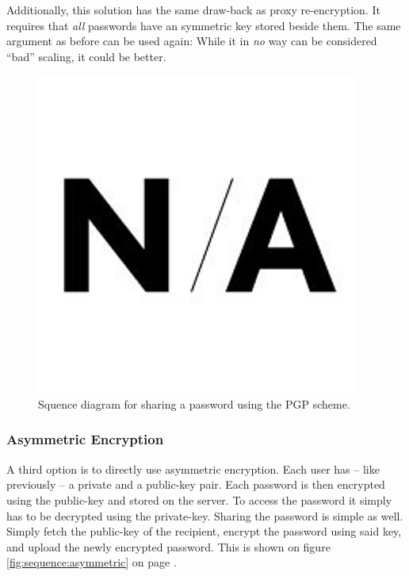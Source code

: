 				Additionally, this solution has the same draw-back as proxy re-encryption. It requires that \emph{all} passwords have an symmetric key stored beside them. The same argument as before can be used again: While it in \emph{no} way can be considered ``bad'' scaling, it could be better.

				\begin{figure}[h!]
					\centering
					\includegraphics[width=\textwidth]{figures/design/na.png}
					\caption{Squence diagram for sharing a password using the PGP scheme.}
					\label{fig:sequence:pgp}
				\end{figure}

			\subsubsection{Asymmetric Encryption}
				\label{sec:assymetric}
				A third option is to directly use asymmetric encryption. Each user has -- like previously -- a private and a public-key pair. Each password is then encrypted using the public-key and stored on the server. To access the password it simply has to be decrypted using the private-key. Sharing the password is simple as well. Simply fetch the public-key of the recipient, encrypt the password using said key, and upload the newly encrypted password. This is shown on figure \ref{fig:sequence:asymmetric} on page \pageref{fig:sequence:asymmetric}.


